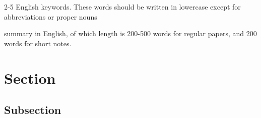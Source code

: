 %



\manyauthor %


\author{%
     {user1@ai-gakkai.or.jp, http://www.ai-gakkai.or.jp/~user1/}
\and
     {user2@ai-gakkai.or.jp, http://www.ai-gakkai.or.jp/~user2/}
\and
\and
\and
}
\begin{keyword}
2-5 English keywords. These words should be written in lowercase
except for abbreviations or proper nouns
\end{keyword}

\begin{summary}
summary in English, of which length is 200-500 words for regular
papers, and 200 words for short notes.
\end{summary}


\maketitle

\section{Section}
\subsection{Subsection}
